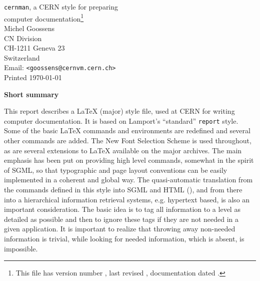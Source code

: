 \newcommand{\LMsty}[1]{\texttt{#1}\index{#1@{\texttt{#1} style}}}
\let\Lmsty\LMsty

\newcommand{\eg}{e.g.,\@\xspace} %
\newcommand{\ie}{i.e.,\@\xspace} %
\newcommand{\etc}{etc.\@\xspace} %

\newenvironment{tabledesc}{\begin{quote}\footnotesize}{\end{quote}}

\renewcommand{\DVI}{\texttt{dvi}\index{dvi file}}
\newcommand{\DVIPS}{\texttt{dvips}\index{dvips program}}
\newcommand{\gif}{gif\index{gif}}
\newcommand{\Html}{HTML\index{HTML}}
\renewcommand{\PS}{PostScript\index{PostScript}}
\newcommand{\PTD}{\texttt{ptd}\index{ptd program}}
\newcommand{\SGML}{SGML\index{SGML}}
\newcommand{\URL}{URL\index{URL!Universal Resource Locator}}
\newcommand{\Xmosaic}{Xmosaic\index{Xmosaic!HTML viewer}}

\PScommands%
\makeindex
\hoffset=0mm

\begin{titlepage}%
\begin{center}
\huge \texttt{cernman}, a CERN style for preparing \\
       computer documentation\footnote{This file
       has version number \fileversion, last
       revised \filedate, documentation dated \docdate.}\\[10mm]
\Large  Michel Goossens\\
        CN Division\\
        CH-1211 Geneva 23 \\
        Switzerland\\
        Email:  \texttt{<goossens@cernvm.cern.ch>}\\[5mm]
\large Printed \today
\end{center}
\vfill
\begin{center}\large\bf Short summary\end{center}

This report describes a \LaTeX{} (major) style file, used at CERN
for writing computer documentation.
It is based on Lamport's\cite{bib-LATEX} ``standard'' \LMsty{report} style.
Some of the basic \LaTeX{} commands and environments are redefined
and several other commands are added.
The New Font Selection Scheme is used throughout, as are several extensions
to \LaTeX{} available on the major archives.
The main emphasis has been put on providing high level commands,
somewhat in the spirit of \SGML, so that typographic and page layout 
conventions can be easily implemented in a coherent and global way.
The quasi-automatic translation from the commands defined in this style
into \SGML{} and \Html{} (\WWW),
and from there into a hierarchical information retrieval 
systems, e.g. hypertext based, is also an important consideration.
The basic idea is to tag all information to a level as detailed as possible
and then to ignore these tags if they are not needed in a given application.
It is important to realize that throwing away non-needed information is
trivial, while looking for needed information, which is absent, is impossible.
\vfill
\end{titlepage}
\setcounter{page}{2}

